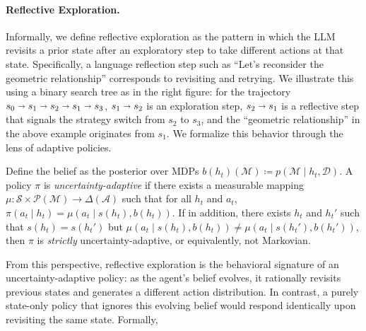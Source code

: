 \paragraph{Reflective Exploration.} Informally, we define reflective exploration as the pattern in which the LLM revisits a prior state after an exploratory step to take different actions at that state. Specifically, a language reflection step such as ``Let's reconsider the geometric relationship'' corresponds to revisiting and retrying. We illustrate this using a binary search tree as in the right figure: for the trajectory $s_0\shortrightarrow s_1\shortrightarrow s_2\shortrightarrow s_1\shortrightarrow s_3$, $s_1\shortrightarrow s_2$ is an exploration step, $s_2\shortrightarrow s_1$ is a reflective step that signals the strategy switch from $s_2$ to $s_3$, and the ``geometric relationship'' in the above example originates from $s_1$. We formalize this behavior through the lens of adaptive policies.

\begin{definition}\label{def_uapi}
Define the belief as the posterior over MDPs $b(h_t)(\mathcal{M}) \coloneqq p(\mathcal{M} \mid h_t, \mathcal{D})$.
A policy $\pi$ is \emph{uncertainty-adaptive} if there exists a measurable mapping $\mu: \mathcal{S} \times \mathcal{P}(\mathcal{M}) \to \Delta(\mathcal{A})$ such that for all $h_t$ and $a_t$, $\pi(a_t\mid h_t)=\mu(a_t \mid s(h_t), b(h_t))$. If in addition, there exists $h_t$ and $h_t'$ such that $s(h_t)=s(h_t')$ but $\mu(a_t \mid s(h_t), b(h_t))\neq\mu(a_t \mid s(h_t'), b(h_t'))$, then $\pi$ is \emph{strictly} uncertainty-adaptive, or equivalently, not Markovian.
\end{definition}
From this perspective, reflective exploration is the behavioral signature of an uncertainty-adaptive policy: as the agent’s belief evolves, it rationally revisits previous states and generates a different action distribution. In contrast, a purely state-only policy that ignores this evolving belief would respond identically upon revisiting the same state. Formally,

